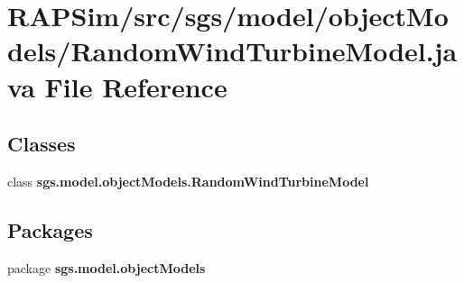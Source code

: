 \section{R\-A\-P\-Sim/src/sgs/model/object\-Models/\-Random\-Wind\-Turbine\-Model.java File Reference}
\label{_random_wind_turbine_model_8java}
\subsection*{Classes}
\begin{DoxyCompactItemize}
\item 
class {\bf sgs.\-model.\-object\-Models.\-Random\-Wind\-Turbine\-Model}
\end{DoxyCompactItemize}
\subsection*{Packages}
\begin{DoxyCompactItemize}
\item 
package {\bf sgs.\-model.\-object\-Models}
\end{DoxyCompactItemize}
